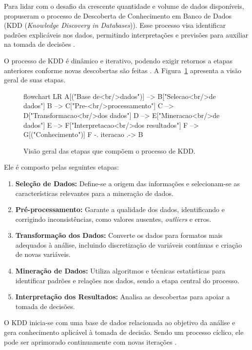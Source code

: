 Para lidar com o desafio da crescente quantidade e volume de dados disponíveis,  propuseram o processo de Descoberta de Conhecimento em Banco de Dados (KDD (\textit{Knowledge Discovery in Databases})). Esse processo visa identificar padrões explicáveis nos dados, permitindo interpretações e previsões para auxiliar na tomada de decisões \cite{baker2011}.

O processo de KDD é dinâmico e iterativo, podendo exigir retornos a etapas anteriores conforme novas descobertas são feitas \cite{fayyad1996}. A Figura~\ref{fig:kdd} apresenta a visão geral de suas etapas.

\begin{figure}[htb]
\centering
\caption{Visão geral das etapas que compõem o processo de KDD.}
\label{fig:kdd}
\begin{mermaid}[width=0.85\textwidth,keepaspectratio]
flowchart LR
  A[("Base de<br/>dados")] --> B["Selecao<br/>de dados"]
  B --> C["Pre-<br/>processamento"]
  C --> D["Transformacao<br/>dos dados"]
  D --> E["Mineracao<br/>de dados"]
  E --> F["Interpretacao<br/>dos resultados"]
  F --> G[("Conhecimento")]
  F -. iteracao .-> B
\end{mermaid}
\end{figure}

Ele é composto pelas seguintes etapas:

\begin{enumerate}
    \item \textbf{Seleção de Dados:} Define-se a origem das informações e selecionam-se as características relevantes para a mineração de dados.
    \item \textbf{Pré-processamento:} Garante a qualidade dos dados, identificando e corrigindo inconsistências, como valores ausentes, \textit{outliers} e erros.
    \item \textbf{Transformação dos Dados:} Converte os dados para formatos mais adequados à análise, incluindo discretização de variáveis contínuas e criação de novas variáveis.
    \item \textbf{Mineração de Dados:} Utiliza algoritmos e técnicas estatísticas para identificar padrões e relações nos dados, sendo a etapa central do processo.
    \item \textbf{Interpretação dos Resultados:} Analisa as descobertas para apoiar a tomada de decisões.
\end{enumerate}

O KDD inicia-se com uma base de dados relacionada ao objetivo da análise e gera conhecimento aplicável à tomada de decisão. Sendo um processo cíclico, ele pode ser aprimorado continuamente com novas iterações \cite{maimon2010}.

